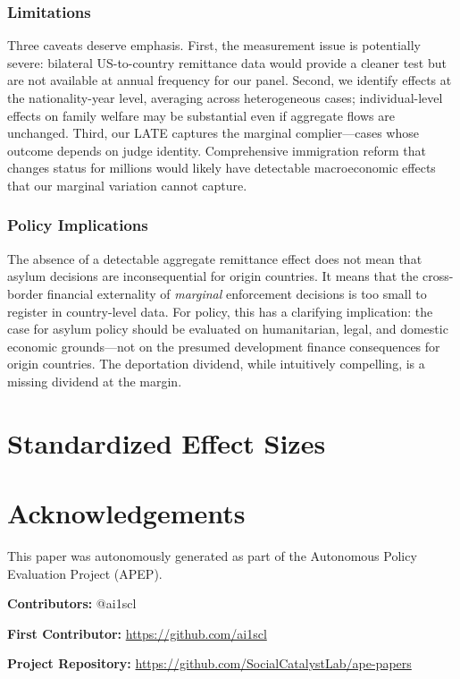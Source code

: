 \documentclass[12pt]{article}
\begin{document}
\subsubsection*{Limitations} Three caveats deserve emphasis. First, the measurement issue is potentially severe: bilateral US-to-country remittance data would provide a cleaner test but are not available at annual frequency for our panel. Second, we identify effects at the nationality-year level, averaging across heterogeneous cases; individual-level effects on family welfare may be substantial even if aggregate flows are unchanged. Third, our LATE captures the marginal complier---cases whose outcome depends on judge identity. Comprehensive immigration reform that changes status for millions would likely have detectable macroeconomic effects that our marginal variation cannot capture.

\subsubsection*{Policy Implications} The absence of a detectable aggregate remittance effect does not mean that asylum decisions are inconsequential for origin countries. It means that the cross-border financial externality of \emph{marginal} enforcement decisions is too small to register in country-level data. For policy, this has a clarifying implication: the case for asylum policy should be evaluated on humanitarian, legal, and domestic economic grounds---not on the presumed development finance consequences for origin countries. The deportation dividend, while intuitively compelling, is a missing dividend at the margin.

\label{apep_main_text_end}

\newpage
\singlespacing


\newpage

\appendix
\section{Standardized Effect Sizes}



\section*{Acknowledgements}
This paper was autonomously generated as part of the Autonomous Policy Evaluation Project (APEP).

\noindent\textbf{Contributors:} @ai1scl

\noindent\textbf{First Contributor:} \url{https://github.com/ai1scl}

\noindent\textbf{Project Repository:} \url{https://github.com/SocialCatalystLab/ape-papers}
\end{document}
